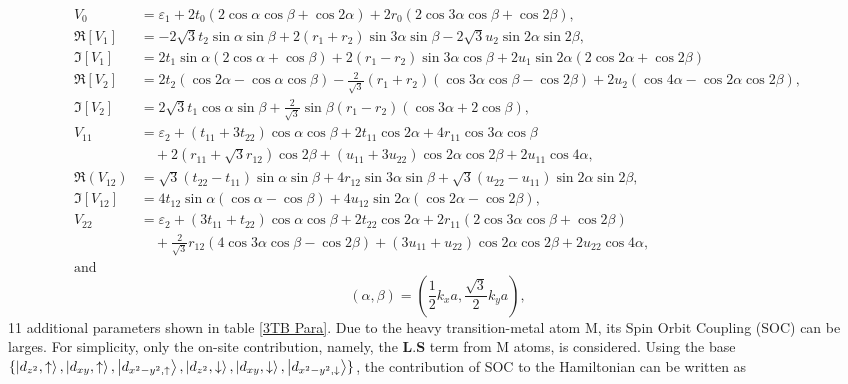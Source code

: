 \documentclass[12pt,english,a4paper]{article}
\begin{document}
	\begin{align*}
		V_0 &= \varepsilon_1 + 2t_0 (2\cos\alpha\cos\beta + \cos2\alpha) + 2r_0 (2\cos3\alpha\cos\beta+\cos2\beta),\\
		\Re[V_1]&= -2\sqrt{3}t_2 \sin \alpha \sin \beta + 2(r_1 + r_2)\sin 3 \alpha \sin \beta - 2\sqrt{3} u_2 \sin 2\alpha \sin 2\beta,\\
		\Im[V_1] &= 2 t_1 \sin \alpha (2 \cos \alpha +\cos \beta) + 2(r_1 - r_2) \sin 3\alpha \cos \beta + 2u_1 \sin 2\alpha (2\cos 2\alpha + \cos 2\beta)\\
		\Re[V_2] &= 2t_2 (\cos 2\alpha - \cos \alpha \cos \beta) -\frac{2}{\sqrt{3}} (r_1 + r_2 ) (\cos 3\alpha \cos \beta - \cos 2 \beta) + 2u_2 (\cos 4\alpha -\cos 2\alpha \cos 2\beta),\\
		\Im[V_2] &= 2\sqrt{3} t_1 \cos \alpha \sin \beta +\frac{2}{\sqrt{3}} \sin \beta (r_1 -r_2 )(\cos 3\alpha + 2\cos \beta),\\
		V_{11} & = \varepsilon_2 + (t_{11}+3t_{22})\cos \alpha \cos \beta + 2 t_{11} \cos 2\alpha + 4r_{11} \cos 3\alpha \cos \beta \\ &\quad +2 (r_{11} + \sqrt{3} r_{12}) \cos 2\beta + (u_{11} + 3 u_{22})\cos 2 \alpha \cos 2\beta + 2 u_{11} \cos 4\alpha,\\
		\Re(V_{12}) &= \sqrt{3} (t_{22} - t_{11}) \sin \alpha \sin \beta +4 r_{12} \sin 3\alpha \sin \beta + \sqrt{3} (u_{22} - u_{11}) \sin 2\alpha \sin 2\beta,\\
		\Im[V_{12}] &= 4 t_{12} \sin \alpha (\cos \alpha -\cos \beta) + 4u_{12} \sin 2\alpha (\cos 2\alpha - \cos 2\beta),\\
		V_{22} &= \varepsilon_2 +(3t_{11} + t_{22}) \cos \alpha \cos \beta + 2 t_{22} \cos 2 \alpha + 2 r_{11}(2\cos 3\alpha \cos \beta + \cos 2 \beta) \\&\quad + \frac{2}{\sqrt{3}} r_{12} (4\cos 3\alpha \cos \beta - \cos 2\beta) + (3 u_{11} + u_{22}) \cos 2\alpha \cos 2\beta + 2u_{22} \cos 4\alpha,\\
		\text{and}&
		\end{align*}
		\begin{equation}		
			(\alpha,\beta) =  (\frac{1}{2}k_x a, \frac{\sqrt{3}}{2}k_y a),
		\end{equation}
	11 additional parameters shown in table \ref{3TB Para}. Due to the heavy transition-metal atom M, its Spin Orbit Coupling (SOC) can be larges. For simplicity, only the on-site contribution, namely, the $\textbf{L}.\textbf{S}$ term from M atoms, is considered. Using the base $\{\ket{d_{z^2},\uparrow},\ket{d_{xy},\uparrow},\ket{d_{x^2-y^2,\uparrow}},\ket{d_{z^2},\downarrow},\ket{d_{xy},\downarrow},\ket{d_{x^2-y^2,\downarrow}}\}$, the contribution of SOC to the Hamiltonian can be written as
\end{document}
